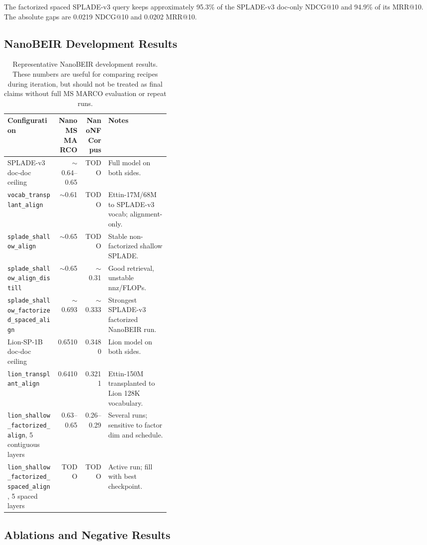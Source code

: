 \documentclass[
]{ceurart}
\begin{document}
The factorized spaced SPLADE-v3 query keeps approximately 95.3\% of the
SPLADE-v3 doc-only NDCG@10 and 94.9\% of its MRR@10. The absolute gaps are
0.0219 NDCG@10 and 0.0202 MRR@10.

\subsection{NanoBEIR Development Results}

\begin{table}[t]
\caption{Representative NanoBEIR development results. These numbers are useful
for comparing recipes during iteration, but should not be treated as final
claims without full MS MARCO evaluation or repeat runs.}
\label{tab:nanobeir}
\centering
\begin{tabular}{lrrp{0.38\linewidth}}
\toprule
Configuration & NanoMSMARCO & NanoNFCorpus & Notes \\
\midrule
SPLADE-v3 doc-doc ceiling & $\sim$0.64--0.65 & TODO & Full model on both sides. \\
\texttt{vocab\_transplant\_align} & $\sim$0.61 & TODO & Ettin-17M/68M to SPLADE-v3 vocab; alignment-only. \\
\texttt{splade\_shallow\_align} & $\sim$0.65 & TODO & Stable non-factorized shallow SPLADE. \\
\texttt{splade\_shallow\_align\_distill} & $\sim$0.65 & $\sim$0.31 & Good retrieval, unstable nnz/FLOPs. \\
\texttt{splade\_shallow\_factorized\_spaced\_align} & $\sim$0.693 & $\sim$0.333 & Strongest SPLADE-v3 factorized NanoBEIR run. \\
Lion-SP-1B doc-doc ceiling & 0.6510 & 0.3480 & Lion model on both sides. \\
\texttt{lion\_transplant\_align} & 0.6410 & 0.3211 & Ettin-150M transplanted to Lion 128K vocabulary. \\
\texttt{lion\_shallow\_factorized\_align}, 5 contiguous layers & 0.63--0.65 & 0.26--0.29 & Several runs; sensitive to factor dim and schedule. \\
\texttt{lion\_shallow\_factorized\_spaced\_align}, 5 spaced layers & TODO & TODO & Active run; fill with best checkpoint. \\
\bottomrule
\end{tabular}
\end{table}

\subsection{Ablations and Negative Results}
\end{document}
